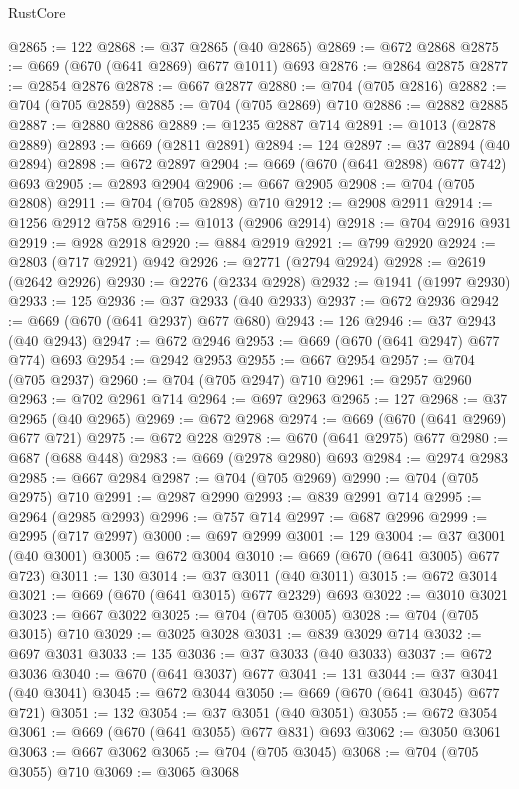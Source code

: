 \begin{lexlean}{RustCore}
\begin{coremodule}
@2865 := 122
@2868 := @37 @2865 (@40 @2865)
@2869 := @672 @2868
@2875 := @669 (@670 (@641 @2869) @677 @1011) @693
@2876 := @2864 @2875
@2877 := @2854 @2876
@2878 := @667 @2877
@2880 := @704 (@705 @2816)
@2882 := @704 (@705 @2859)
@2885 := @704 (@705 @2869) @710
@2886 := @2882 @2885
@2887 := @2880 @2886
@2889 := @1235 @2887 @714
@2891 := @1013 (@2878 @2889)
@2893 := @669 (@2811 @2891)
@2894 := 124
@2897 := @37 @2894 (@40 @2894)
@2898 := @672 @2897
@2904 := @669 (@670 (@641 @2898) @677 @742) @693
@2905 := @2893 @2904
@2906 := @667 @2905
@2908 := @704 (@705 @2808)
@2911 := @704 (@705 @2898) @710
@2912 := @2908 @2911
@2914 := @1256 @2912 @758
@2916 := @1013 (@2906 @2914)
@2918 := @704 @2916 @931
@2919 := @928 @2918
@2920 := @884 @2919
@2921 := @799 @2920
@2924 := @2803 (@717 @2921) @942
@2926 := @2771 (@2794 @2924)
@2928 := @2619 (@2642 @2926)
@2930 := @2276 (@2334 @2928)
@2932 := @1941 (@1997 @2930)
@2933 := 125
@2936 := @37 @2933 (@40 @2933)
@2937 := @672 @2936
@2942 := @669 (@670 (@641 @2937) @677 @680)
@2943 := 126
@2946 := @37 @2943 (@40 @2943)
@2947 := @672 @2946
@2953 := @669 (@670 (@641 @2947) @677 @774) @693
@2954 := @2942 @2953
@2955 := @667 @2954
@2957 := @704 (@705 @2937)
@2960 := @704 (@705 @2947) @710
@2961 := @2957 @2960
@2963 := @702 @2961 @714
@2964 := @697 @2963
@2965 := 127
@2968 := @37 @2965 (@40 @2965)
@2969 := @672 @2968
@2974 := @669 (@670 (@641 @2969) @677 @721)
@2975 := @672 @228
@2978 := @670 (@641 @2975) @677
@2980 := @687 (@688 @448)
@2983 := @669 (@2978 @2980) @693
@2984 := @2974 @2983
@2985 := @667 @2984
@2987 := @704 (@705 @2969)
@2990 := @704 (@705 @2975) @710
@2991 := @2987 @2990
@2993 := @839 @2991 @714
@2995 := @2964 (@2985 @2993)
@2996 := @757 @714
@2997 := @687 @2996
@2999 := @2995 (@717 @2997)
@3000 := @697 @2999
@3001 := 129
@3004 := @37 @3001 (@40 @3001)
@3005 := @672 @3004
@3010 := @669 (@670 (@641 @3005) @677 @723)
@3011 := 130
@3014 := @37 @3011 (@40 @3011)
@3015 := @672 @3014
@3021 := @669 (@670 (@641 @3015) @677 @2329) @693
@3022 := @3010 @3021
@3023 := @667 @3022
@3025 := @704 (@705 @3005)
@3028 := @704 (@705 @3015) @710
@3029 := @3025 @3028
@3031 := @839 @3029 @714
@3032 := @697 @3031
@3033 := 135
@3036 := @37 @3033 (@40 @3033)
@3037 := @672 @3036
@3040 := @670 (@641 @3037) @677
@3041 := 131
@3044 := @37 @3041 (@40 @3041)
@3045 := @672 @3044
@3050 := @669 (@670 (@641 @3045) @677 @721)
@3051 := 132
@3054 := @37 @3051 (@40 @3051)
@3055 := @672 @3054
@3061 := @669 (@670 (@641 @3055) @677 @831) @693
@3062 := @3050 @3061
@3063 := @667 @3062
@3065 := @704 (@705 @3045)
@3068 := @704 (@705 @3055) @710
@3069 := @3065 @3068

\end{coremodule}
\end{lexlean}
